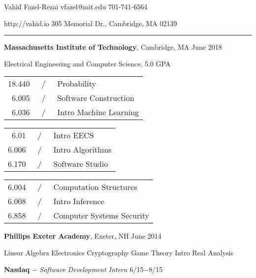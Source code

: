\documentclass[11pt]{article}
\newcommand{\msection}[1]{\vspace{1em}\marginnote{#1}} %
\newcommand{\bt}[1]{\textbf{#1}} %
\newcommand{\gap}[0]{\vspace{0.5em}} %
\newcommand{\dash}[0]{ $-$ } %
\newcommand{\tabsep}[0]{\, / \,} %
\begin{document}

{\huge Vahid Fazel-Rezai} \hfill vfazel@mit.edu \hspace{4.5em} 701-741-6564

\vspace{0.5em}

http://vahid.io \hfill 305 Memorial Dr., Cambridge, MA 02139

\vspace{0.2em}

\hspace{-1.2in}\rule{7.9in}{0.2em}

\vspace{-0.4em}



\msection{Education}

\bt{Massachusetts Institute of Technology}, Cambridge, MA \hfill June 2018

Electrical Engineering and Computer Science, 5.0 GPA
\vspace{0.15em}

\begin{tabular}{rcl}
18.440 & \tabsep & Probability \\
6.005 & \tabsep & Software Construction \\
6.036 & \tabsep & Intro Machine Learning
\end{tabular}
\hfill
\begin{tabular}{rcl}
6.01 & \tabsep & Intro EECS \\
6.006 & \tabsep & Intro Algorithms \\
6.170 & \tabsep & Software Studio
\end{tabular}
\hfill
\begin{tabular}{rcl}
6.004 & \tabsep & Computation Structures \\
6.008 & \tabsep & Intro Inference \\
6.858 & \tabsep & Computer Systems Security
\end{tabular}

\gap

\bt{Phillips Exeter Academy}, Exeter, NH \hfill June 2014

Linear Algebra
\hfill
Electronics
\hfill
Cryptography
\hfill
Game Theory
\hfill
Intro Real Analysis



\msection{Work}

\bt{Nasdaq}\dash \emph{Software Development Intern} \hfill 6/15$-$8/15
\end{document}
